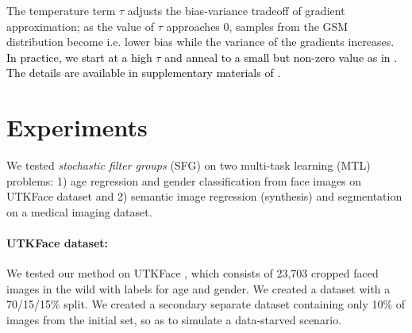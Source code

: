  The temperature term $\tau$ adjusts the bias-variance tradeoff of gradient approximation; as the value of $\tau$ approaches 0, samples from the GSM distribution become  i.e. lower bias while the variance of the gradients increases. \textcolor{black}{In practice, we start at a high $\tau$ and anneal to a small but non-zero value as in \cite{jang2016categorical,gal2017concrete}. The details are available in supplementary materials of \cite{sfg2019}.}






\clearpage
\section{Experiments}\label{sec:experiments}
We tested \emph{stochastic filter groups} (SFG) on two multi-task learning (MTL) problems: 1) age regression and gender classification from face images on UTKFace dataset \cite{zhifei2017cvpr} and 2) semantic image regression (synthesis) and segmentation on a medical imaging dataset. 

    \paragraph{UTKFace dataset:} We tested our method on UTKFace \cite{zhifei2017cvpr}, which consists of 23,703 cropped faced images in the wild with labels for age and gender. We created a dataset with a 70/15/15\% split. We created a secondary separate dataset containing only 10\% of images from the initial set, so as to simulate a data-starved scenario.
